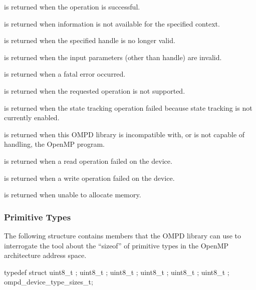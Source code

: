 \descr
\label{ompd:ompd_rc_ok}
 is returned when the operation is successful.

\label{ompd:ompd_rc_unavailable}
 is returned when
information is not available for the specified context.

\label{ompd:ompd_rc_stale_handle}
 is returned when
the specified handle is no longer valid.

\label{ompd:ompd_rc_bad_input}
 is returned when
the input parameters (other than handle) are invalid.

\label{ompd:ompd_rc_error}
 is returned when
a fatal error occurred.

\label{ompd:ompd_rc_unsupported}
 is returned when
the requested operation is not supported.

\label{ompd:ompd_rc_needs_state_tracking}
 is returned when
the state tracking operation failed because state tracking is not currently enabled.

\label{ompd:ompd_rc_incompatible}
 is returned when
this OMPD library is incompatible with, or is not capable of handling, the OpenMP program.

\label{ompd:ompd_rc_device_read_error}
 is returned when
a read operation failed on the device.

\label{ompd:ompd_rc_device_write_error}
 is returned when
a write operation failed on the device.

\label{ompd:ompd_rc_nomem}
 is returned when
unable to allocate memory.


\subsubsection{Primitive Types}
\label{subsubsec:ompd_device_type_sizes_t}
The following structure contains members that the OMPD library can use
to interrogate the tool about the ``sizeof'' of primitive types in the OpenMP architecture
address space.

\format

\begin{ccppspecific}
\begin{ompSyntax}
typedef struct {
  uint8_t ;
  uint8_t ;
  uint8_t ;
  uint8_t ;
  uint8_t ;
  uint8_t ;
} ompd_device_type_sizes_t;
\end{ompSyntax}
\end{ccppspecific}


